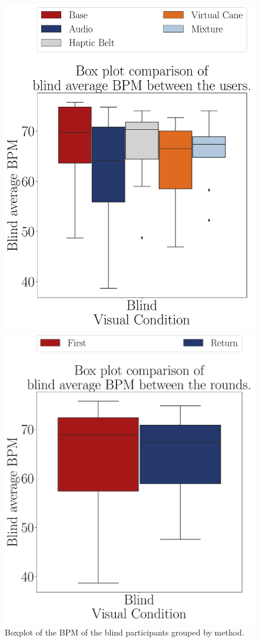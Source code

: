 \begin{figure}[!htb]
    \centering
    \begin{minipage}{0.45\textwidth}
        \centering
        \includegraphics[width = 0.8\linewidth]{Resultados/ECG/Figuras/pdf/boxplot_ecg_bpm_blind_scene.pdf}
        \caption{Boxplot of the BPM of the blind participants grouped by method.}
        \label{fig:boxplot_ecg_bpm_blind_scene}
    \end{minipage}
    \begin{minipage}{0.075\textwidth}
        \hfill
    \end{minipage}
    \begin{minipage}{0.45\textwidth}
        \centering
        \includegraphics[width = 0.8\linewidth]{Resultados/ECG/Figuras/pdf/boxplot_ecg_bpm_blind_rounds.pdf}

\end{minipage}
\end{figure}
